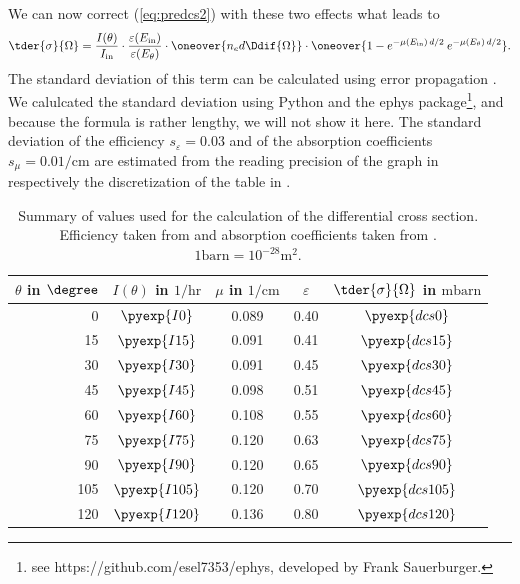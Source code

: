 We can now correct (\ref{eq:predcs2}) with these two effects what leads to
\begin{align}
  \tder{\sigma}{\Omega} = \frac{I(\theta)}{I_{\mathrm{in}}} \cdot
  \frac{\varepsilon(E_{\mathrm{in}})}{\varepsilon(E_\theta)} \cdot \oneover{n_e d
  \Ddif{\Omega}} \cdot \oneover{1-e^{-\mu(E_{\mathrm{in}}) \,d/2} \: e^{-\mu(E_\theta) \,d/2}}.
  \label{eq:dcs}
\end{align}
The standard deviation of this term can be calculated using 
error propagation \cite{cowan}. We calulcated the standard deviation using
Python and the ephys package\footnote{see https://github.com/esel7353/ephys,
developed by Frank Sauerburger.}, and because the formula is rather lengthy, we
will not show it here. The standard deviation of the efficiency
$s_\varepsilon = 0.03$ and of the absorption coefficients $s_\mu =
0.01/\mathrm{cm}$ are estimated from the reading precision of the graph in
\cite{fluegge} respectively the discretization of the table in \cite{anleitung}.

\begin{table}[htbp]
  \centering
  \begin{tabular}{rcccc}
  $\theta$ in $\degree$ & $I(\theta)$ in $1/\mathrm{hr}$ & $\mu$ in
  $1/\mathrm{cm}$ & $\varepsilon$ & $\tder{\sigma}{\Omega}$ in $\mathrm{mbarn}$ \\ \toprule[1.5pt]
  0 & $\pyexp{I0}$ & 0.089 & 0.40 & $\pyexp{dcs0}$ \\ 
  15 & $\pyexp{I15}$ & 0.091 & 0.41 & $\pyexp{dcs15}$ \\ 
  30 & $\pyexp{I30}$ & 0.091 & 0.45 & $\pyexp{dcs30}$ \\ 
  45 & $\pyexp{I45}$ & 0.098 & 0.51 & $\pyexp{dcs45}$ \\ 
  60 & $\pyexp{I60}$ & 0.108 & 0.55 & $\pyexp{dcs60}$ \\ 
  75 & $\pyexp{I75}$ & 0.120 & 0.63 & $\pyexp{dcs75}$ \\ 
  90 & $\pyexp{I90}$ & 0.120 & 0.65 & $\pyexp{dcs90}$ \\ 
  105 & $\pyexp{I105}$ & 0.120 & 0.70 & $\pyexp{dcs105}$ \\ 
  120 & $\pyexp{I120}$ & 0.136 & 0.80 & $\pyexp{dcs120}$ \\ \bottomrule[1.5pt]
  \end{tabular}
  \caption{Summary of values used for the calculation of the differential cross
  section. Efficiency taken from \cite{fluegge} and absorption coefficients
  taken from \cite{anleitung}. $1 \mathrm{barn} = 10^{-28} \mathrm{m}^2$.}
  \label{tab:cross}
\end{table}

